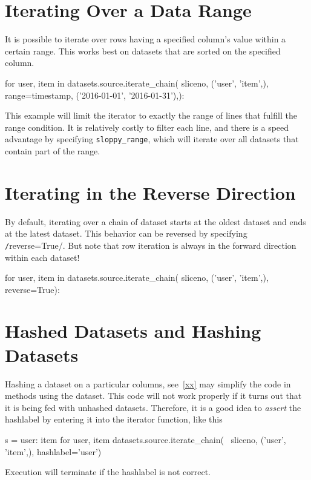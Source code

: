 \section{Iterating Over a Data Range}
It is possible to iterate over rows having a specified column's value
within a certain range.  This works best on datasets that are sorted
on the specified column.  
\begin{python}
for user, item in datasets.source.iterate_chain(
    sliceno, ('user', 'item',),
    range={timestamp, ('2016-01-01', '2016-01-31'),}):
\end{python}
This example will limit the iterator to exactly the range of lines
that fulfill the range condition.  It is relatively costly to filter
each line, and there is a speed advantage by specifying
\texttt{sloppy\_range}, which will iterate over all datasets that
contain part of the range.



\section{Iterating in the Reverse Direction}
By default, iterating over a chain of dataset starts at the oldest
dataset and ends at the latest dataset.  This behavior can be
reversed by specifying \texttt/reverse=True/.  But note
that row iteration is always in the forward direction within each
dataset!
\begin{python}
for user, item in datasets.source.iterate_chain(
    sliceno, ('user', 'item',),
    reverse=True):
\end{python}



\section{Hashed Datasets and Hashing Datasets}
Hashing a dataset on a particular columns, see~\ref{xx} may simplify
the code in methods using the dataset.  This code will not work
properly if it turns out that it is being fed with unhashed datasets.
Therefore, it is a good idea to \emph{assert} the hashlabel by
entering it into the iterator function, like this
\begin{python}
s = {user: item for user, item datasets.source.iterate_chain( \
     sliceno, ('user', 'item',), hashlabel='user')}
\end{python}
Execution will terminate if the hashlabel is not correct.

